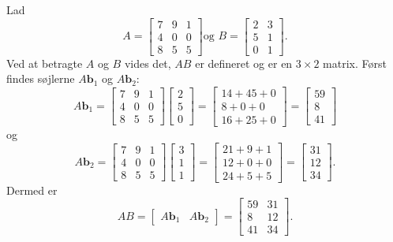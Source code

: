 \begin{eks}
Lad 
$$
A=
\begin{bmatrix}
7 & 9 & 1 \\
4 & 0 & 0 \\
8 & 5 & 5
\end{bmatrix}
\text{og }
B=
\begin{bmatrix}
2 & 3 \\
5 & 1 \\
0 & 1 
\end{bmatrix}
\text{.}
$$
Ved at betragte $A$ og $B$ vides det, $AB$ er defineret og er en $3 \times 2$ matrix. 
Først findes søjlerne $A\textbf{b}_1$ og $A\textbf{b}_2$:
$$
A\textbf{b}_1=
\begin{bmatrix}
7 & 9 & 1 \\
4 & 0 & 0 \\
8 & 5 & 5
\end{bmatrix}
\begin{bmatrix}
2 \\
5 \\
0
\end{bmatrix}
=
\begin{bmatrix}
14 + 45 + 0 \\
8 + 0 + 0 \\
16 + 25 + 0
\end{bmatrix}
=
\begin{bmatrix}
59 \\
8 \\
41
\end{bmatrix}
$$
og
$$
A\textbf{b}_2=
\begin{bmatrix}
7 & 9 & 1 \\
4 & 0 & 0 \\
8 & 5 & 5
\end{bmatrix}
\begin{bmatrix}
3 \\
1 \\
1
\end{bmatrix}
=
\begin{bmatrix}
21 + 9 + 1 \\
12 + 0 + 0 \\
24 + 5 + 5
\end{bmatrix}
=
\begin{bmatrix}
31 \\
12 \\
34
\end{bmatrix}
\text{.}
$$
Dermed er 
$$
AB=
\begin{bmatrix}
A\textbf{b}_1 & A\textbf{b}_2
\end{bmatrix}
=
\begin{bmatrix}
59 & 31 \\
8 & 12 \\
41 & 34
\end{bmatrix}.
$$
\end{eks}
